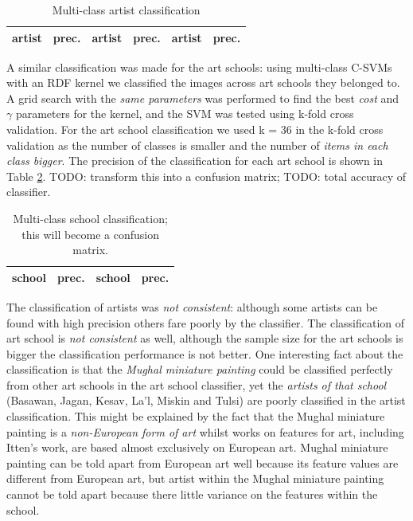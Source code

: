 \documentclass[11pt,a4paper,twoside,openright,draft]{report}
\begin{document}
\begin{multicols}{2}
\begin{table}[tpb]
\centering
{}
\begin{tabular}{|l|r||l|r||l|r|}
\toprule
artist & prec. & artist & prec. & artist & prec. \\
\midrule

\bottomrule
\end{tabular}
\caption[Multi-class artist classification]{Multi-class artist classification}
\label{tab:predart}
\end{table}

A similar classification was made for the art schools: using multi-class C-SVMs
with an RDF kernel we classified the images across art schools they belonged
to.  A grid search with the \emph{same parameters} was performed to find the
best \emph{cost} and $\gamma$ parameters for the kernel, and the SVM was tested
using k-fold cross validation.  For the art school classification we used k =
36 in the k-fold cross validation as the number of classes is smaller and the
number of \emph{items in each class bigger}.  The precision of the
classification for each art school is shown in Table \ref{tab:predsch}.  TODO:
transform this into a confusion matrix; TODO: total accuracy of classifier.

\begin{table}[ptb]
\centering
\begin{tabular}{|l|r||l|r|}
\toprule
school & prec. & school & prec. \\
\midrule

\bottomrule
\end{tabular}
\caption[Multi-class school classification]{Multi-class school classification;
this will become a confusion matrix.}
\label{tab:predsch}
\end{table}

The classification of artists was \emph{not consistent}: although some artists
can be found with high precision others fare poorly by the classifier.  The
classification of art school is \emph{not consistent} as well, although the
sample size for the art schools is bigger the classification performance is not
better.  One interesting fact about the classification is that the \emph{Mughal
miniature painting} could be classified perfectly from other art schools in the
art school classifier, yet the \emph{artists of that school} (Basawan, Jagan,
Kesav, La'l, Miskin and Tulsi) are poorly classified in the artist
classification.  This might be explained by the fact that the Mughal miniature
painting is a \emph{non-European form of art} whilst works on features for art,
including Itten's work, are based almost exclusively on European art.  Mughal
miniature painting can be told apart from European art well because its feature
values are different from European art, but artist within the Mughal miniature
painting cannot be told apart because there little variance on the features
within the school.


\end{multicols}
\end{document}

